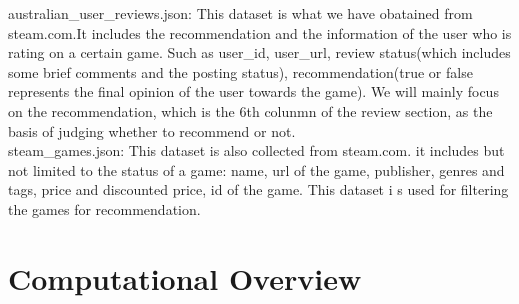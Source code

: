 \documentclass[fontsize=11pt]{article}
\begin{document}
    australian\_user\_reviews.json: This dataset is what we have obatained from steam.com.It includes the recommendation and the information of the user who is rating on a certain game. Such as user\_id, user\_url, review status(which includes some brief comments and the posting status), recommendation(true or false represents the final opinion of the user towards the game). We will mainly focus on the recommendation, which is the 6th colunmn of the review section, as the basis of judging whether to recommend or not.\\
    
    
    steam\_games.json: This dataset is also collected from steam.com. it includes but not limited to the status of a game: name, url of the game, publisher, genres and tags, price and discounted price, id of the game. This dataset i s used for filtering the games for recommendation.
    
    
    \section*{Computational Overview}
\end{document}
